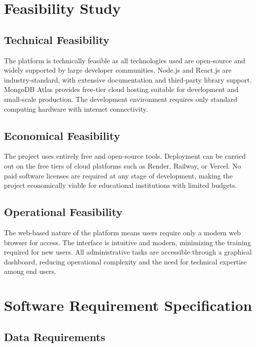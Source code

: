 \documentclass[12pt, a4paper, oneside]{report}
\begin{document}
\section{Feasibility Study}

\subsection{Technical Feasibility}

The platform is technically feasible as all technologies used are open-source and widely supported by large developer communities. Node.js and React.js are industry-standard, with extensive documentation and third-party library support. MongoDB Atlas provides free-tier cloud hosting suitable for development and small-scale production. The development environment requires only standard computing hardware with internet connectivity.

\subsection{Economical Feasibility}

The project uses entirely free and open-source tools. Deployment can be carried out on the free tiers of cloud platforms such as Render, Railway, or Vercel. No paid software licenses are required at any stage of development, making the project economically viable for educational institutions with limited budgets.

\subsection{Operational Feasibility}

The web-based nature of the platform means users require only a modern web browser for access. The interface is intuitive and modern, minimizing the training required for new users. All administrative tasks are accessible through a graphical dashboard, reducing operational complexity and the need for technical expertise among end users.

\section{Software Requirement Specification}

\subsection{Data Requirements}
\end{document}
